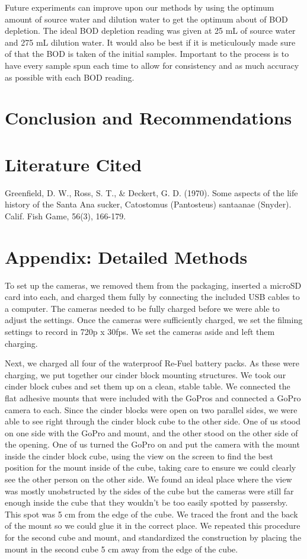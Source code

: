 \documentclass{article}\usepackage[]{graphicx}\usepackage[]{color}
\begin{document}
Future experiments can improve upon our methods by using the optimum amount of source water and dilution water to get the optimum about of BOD depletion. The ideal BOD depletion reading was given at 25 mL of source water and 275 mL dilution water. It would also be best if it is meticulously made sure of that the BOD is taken of the initial samples. Important to the process is to have every sample spun each time to allow for consistency and as much accuracy as possible with each BOD reading. 

\section{Conclusion and Recommendations}


\section{Literature Cited}

Greenfield, D. W., Ross, S. T., \& Deckert, G. D. (1970). Some aspects of the life history of the Santa Ana sucker, Catostomus (Pantosteus) santaanae (Snyder). Calif. Fish Game, 56(3), 166-179. 

\section{Appendix: Detailed Methods}

To set up the cameras, we removed them from the packaging, inserted a microSD card into each, and charged them fully by connecting the included USB cables to a computer. The cameras needed to be fully charged before we were able to adjust the settings. Once the cameras were sufficiently charged, we set the filming settings to record in 720p x 30fps. We set the cameras aside and left them charging. 

Next, we charged all four of the waterproof Re-Fuel battery packs. As these were charging, we put together our cinder block mounting structures. We took our cinder block cubes and set them up on a clean, stable table. We connected the flat adhesive mounts that were included with the GoPros and connected a GoPro camera to each. Since the cinder blocks were open on two parallel sides, we were able to see right through the cinder block cube to the other side. One of us stood on one side with the GoPro and mount, and the other stood on the other side of the opening. One of us turned the GoPro on and put the camera with the mount inside the cinder block cube, using the view on the screen to find the best position for the mount inside of the cube, taking care to ensure we could clearly see the other person on the other side. We found an ideal place where the view was mostly unobstructed by the sides of the cube but the cameras were still far enough inside the cube that they wouldn’t be too easily spotted by passersby. This spot was 5 cm from the edge of the cube. We traced the front and the back of the mount so we could glue it in the correct place. We repeated this procedure for the second cube and mount, and standardized the construction by placing the mount in the second cube 5 cm away from the edge of the cube. 
\end{document}
